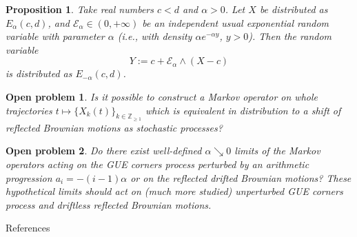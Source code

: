 \documentclass[english,final,t]{beamer}
\newtheorem{proposition}{Proposition}[section]
\newtheorem{question}{Open problem}
\begin{document}
\begin{frame}{}
\begin{columns}[t]
        \begin{column}{.26\linewidth}
            \begin{proposition}
                \label{prop:elementary_swap}
                Take real numbers $c<d$ and $\alpha>0$. 
                Let $X$ be distributed as $E_\alpha(c,d)$,
                and $\mathscr{E}_\alpha\in(0,+\infty)$ be an independent usual
                exponential random variable with parameter $\alpha$
                (i.e., with density $\alpha e^{-\alpha y}$, $y>0$). Then
                the random variable
                \begin{equation}
                    \label{eq:Y_as_function_of_X_elementary_swap}
                    Y:=c+\mathcal{E}_\alpha\wedge(X-c)
                \end{equation}
                is distributed as $E_{-\alpha}(c,d)$.
            \end{proposition}
            \begin{question}
                Is it possible to construct a Markov operator 
                on whole trajectories $t\mapsto \{X_k(t) \}_{k\in \mathbb{Z}_{\ge1}}$
                which is equivalent in distribution to a shift of 
                reflected Brownian motions as stochastic processes?
            \end{question}
            \begin{question}
                Do there exist well-defined $\alpha\searrow0$ limits of the Markov operators acting 
                on the GUE corners process perturbed by an arithmetic progression $a_i=-(i-1)\alpha$
                or on the reflected drifted Brownian motions? 
                These hypothetical limits should act on (much more studied)
                unperturbed GUE corners process and driftless reflected Brownian motions.
            \end{question}
            \begin{block}{References}
                
                
            \end{block}
        \end{column}
    \end{columns}
\end{frame}
\end{document}
